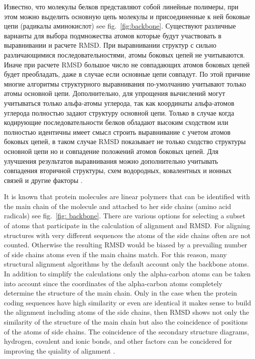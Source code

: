 \documentclass[a4paper, 12pt, titlepage, utf8]{extarticle}
\newcommand{\lookat}[1]{see fig.~\ref{#1}}
\begin{document}
\begin{original}
Известно, что молекулы белков представляют собой линейные полимеры, при этом
можно выделить основную цепь молекулы и присоединенные к ней боковые цепи
(радикалы аминокислот) \lookat{fig:backbone}. Существуют различные варианты для
выбора подмножества атомов которые будут участвовать в выравнивании и расчете
RMSD. При выравнивании структур с сильно различающимися последовательностями,
атомы боковых цепей не учитываются. Иначе при расчете RMSD большое число не
совпадающих атомов боковых цепей будет преобладать, даже в случае если основные
цепи совпадут. По этой причине многие алгоритмы структурного выравнивания
по-умолчанию учитывают только атомы основной цепи. Дополнительно, для упрощения
вычислений могут учитываться только альфа-атомы углерода, так как координаты
альфа-атомов углерода полностью задают структуру основной цепи. Только в случае
когда кодирующие последовательности белков обладают высоким сходством или
полностью идентичны имеет смысл строить выравнивание с учетом атомов боковых
цепей, в таком
случае RMSD показывает не только сходство структуры основной цепи но и
совпадение положений атомов боковых цепей. Для улучшения результатов
выравнивания можно дополнительно учитывать совпадения вторичной структуры, схем
водородных, ковалентных и ионных связей и другие факторы \cite{wiki-3}.
\end{original}

It is known that protein molecules are linear polymers that can be identified
with the main chain of the molecule and attached to her side chains (amino acid
radicals) \lookat{fig: backbone}. There are various options for selecting a
subset of atoms that participate in the calculation of alignment and RMSD. For
aligning structures with very different sequences the atoms of the side chains
often are not counted. Otherwise the resulting RMSD would be biased by a
prevailing number of side chains atoms even if the main chains match. For this
reason, many structural alignment algorithms by the default account only the
backbone atoms. In addition to simplify the calculations only the alpha-carbon
atoms can be taken into account since the coordinates of the alpha-carbon atoms
completely determine the structure of the main chain. Only in the case when the
protein coding sequences have high similarity or even are identical it makes
sense to build the alignment including atoms of the side chains, then  RMSD
shows not
only the similarity of the structure of the main chain but also the coincidence
of positions of the atoms of side chains. The coincidence of the secondary
structure diagrams, hydrogen, covalent and ionic bonds, and other factors can be
concidered for improving the quiality of alignment \cite {wiki-3}.
\end{document}
